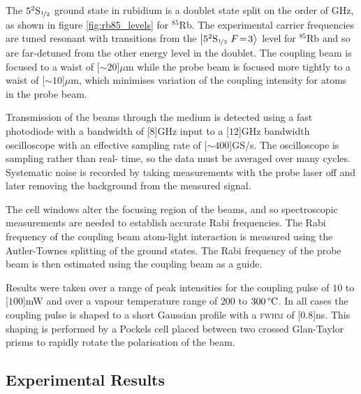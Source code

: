     The $5^2\mathrm{S}_{\nicefrac{1}{2}}$ ground state in rubidium is a doublet
    state split on the order of \unit{GHz}\cite{Arimondo1977}, as shown in
    figure \ref{fig:rb85_levels} for $^{85}$Rb. The experimental carrier
    frequencies are tuned resonant with transitions from the
    $\Ket{5^2\mathrm{S}_{\nicefrac{1}{2}}~F\!=\!3}$ level for $^{85}$Rb and so
    are far-detuned from the other energy level in the doublet. The coupling
    beam is focused to a waist of \unit[${\sim}20$]{$\mu$m} while the probe beam
    is focused more tightly to a waist of \unit[${\sim}10$]{$\mu$m}, which
    minimises variation of the coupling intensity for atoms in the probe
    beam.\cite{Keaveney2013}

    Transmission of the beams through the medium is detected using a fast
    photodiode with a bandwidth of \unit[$8$]{GHz} input to a \unit[$12$]{GHz}
    bandwidth oscilloscope with an effective sampling rate of
    \unit[${\sim}400$]{GS/s}. The oscilloscope is sampling rather than real-
    time, so the data must be averaged over many cycles. Systematic noise is
    recorded by taking measurements with the probe laser off and later removing
    the background from the measured signal.

    The cell windows alter the focusing region of the beams, and so
    spectroscopic measurements are needed to establish accurate Rabi
    frequencies. The Rabi frequency of the coupling beam atom-light interaction
    is measured using the Autler-Townes splitting of the ground states. The Rabi
    frequency of the probe beam is then estimated using the coupling beam as a
    guide.

    Results were taken over a range of peak intensities for the coupling pulse
    of $10$ to \unit[$100$]{mW} and over a vapour temperature range of $200$ to
    $\unit[300]{\textrm{\textdegree C}}$. In all cases the coupling pulse is
    shaped to a short Gaussian profile with a \textsc{fwhm} of \unit[$0.8$]{ns}.
    This shaping is performed by a Pockels cell placed between  two crossed
    Glan-Taylor prisms to rapidly rotate the polarisation of the  beam.

  \subsection{Experimental Results}

